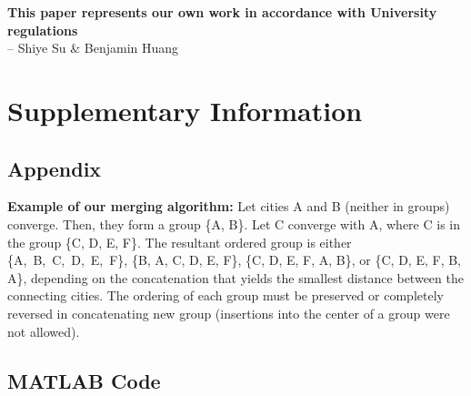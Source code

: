 \documentclass[10pt]{article}
\begin{document}
\bigskip
\begin{center}
\textbf{This paper represents our own work in accordance with University regulations}\\ -- Shiye Su \& Benjamin Huang
\end{center}

\clearpage


\section{Supplementary Information}

\subsection{Appendix}

\textbf{Example of our merging algorithm:} Let cities A and B (neither in groups) converge. Then, they form a 
group \{A, B\}. Let C converge with A, where C is in the group \{C, D, E, F\}. The resultant ordered group is
either \{A,~B,~C,~D,~E,~F\}, \{B, A, C, D, E, F\}, \{C, D, E, F, A, B\}, or \{C, D, E, F, B, A\}, depending on
the concatenation that yields the smallest distance between the connecting cities. The ordering of each group 
must be preserved or completely reversed in concatenating new group (insertions into the center of a group were
not allowed).


\subsection{MATLAB Code}
\end{document}
